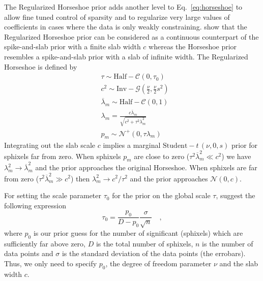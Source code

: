 \documentclass[modern]{aastex62}
\begin{document}
The Regularized Horseshoe prior adds another level to Eq.~\ref{eq:horseshoe} to allow fine tuned control of sparsity and to regularize very large values of coefficients in cases where the data is only weakly constraining.
\cite{piironen2017} show that the Regularized Horseshoe prior can be considered as a continuous counterpart of the spike-and-slab prior with a finite slab width $c$ whereas the Horseshoe prior resembles a spike-and-slab prior with a slab of infinite width.
The Regularized Horseshoe is defined by
\begin{equation}
\begin{aligned}
    &\tau  \sim \mathrm{Half}-\mathcal{C}\left(0, \tau_{0}\right)\\
    &c^{2}  \sim \mathrm{Inv}-\mathcal{G}\left(\frac{\nu}{2}, \frac{\nu}{2} s^{2}\right) \\
    &\overline{\lambda}_{m}  \sim \mathrm{Half}-\mathcal{C}(0,1) \\
    &\lambda_{m} =\frac{c \overline{\lambda}_{m}}{\sqrt{c^{2}+\tau^{2} \overline{\lambda}_{m}^{2}}} \\
    &p_{m}  \sim \mathcal{N}^+\left(0, \tau \lambda_{m}\right) 
\end{aligned}
    \label{eq:reg_horseshoe}
\end{equation}
Integrating out the slab scale $c$ implies a marginal $\mathrm{Student}-\mathit{t}\,(\nu,0,s)$ prior for sphixels far from zero.
When sphixels $p_m$ are close to zero ($\tau^2\overline{\lambda}_m^2\ll c^2$) we have $\lambda_m^2\rightarrow\overline{\lambda}_m^2$ and the prior approaches the original Horseshoe.
When sphixels are far from zero ($\tau^2\overline{\lambda}_m^2\gg c^2$) then $\lambda_m^2\rightarrow c^2/\tau^2$ and the prior approaches $\mathcal{N}(0, c)$.

For setting the scale parameter $\tau_0$ for the prior on the global scale $\tau$, \cite{piironen2017} suggest the following expression
\begin{equation}
    \tau_0=\frac{p_0}{D-p_0}\frac{\sigma}{\sqrt{n}}
    \quad,
    \label{eq:horseshoe_tau0}
\end{equation}
where $p_0$ is our prior guess for the number of significant (sphixels) which are sufficiently far above zero, $D$ is the total number of sphixels, $n$ is the number of data points and $\sigma$ is the standard deviation of the data points (the errobars).
Thus, we only need to specify $p_0$, the degree of freedom parameter $\nu$ and the slab width $c$.
\end{document}
